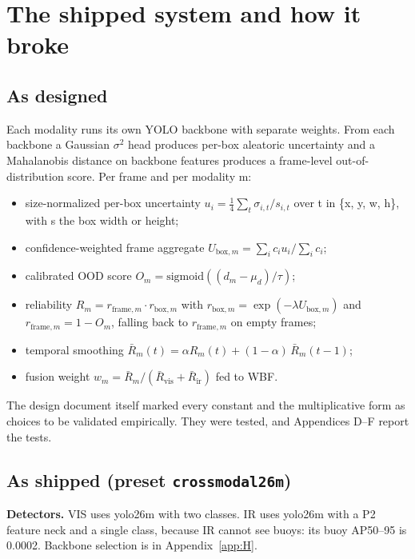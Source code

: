 \documentclass[10pt]{article}
\begin{document}
\FloatBarrier
\section{The shipped system and how it broke}\label{app:D}
\subsection{As designed}\label{app:D.1}
Each modality runs its own YOLO backbone with separate weights. From each backbone a Gaussian $\sigma$$^{2}$ head produces per-box aleatoric uncertainty and a Mahalanobis distance on backbone features produces a frame-level out-of-distribution score. Per frame and per modality m:

\begin{itemize}
\item size-normalized per-box uncertainty $u_i = \frac{1}{4}\sum_t \sigma_{i,t}/s_{i,t}$ over t in \{x, y, w, h\}, with s the box width or height;
\item confidence-weighted frame aggregate $U_{\mathrm{box},m} = \sum_i c_i u_i / \sum_i c_i$;
\item calibrated OOD score $O_m = \mathrm{sigmoid}((d_m - \mu_d)/\tau)$;
\item reliability $R_m = r_{\mathrm{frame},m} \cdot r_{\mathrm{box},m}$ with $r_{\mathrm{box},m} = \exp(-\lambda U_{\mathrm{box},m})$ and $r_{\mathrm{frame},m} = 1 - O_m$, falling back to $r_{\mathrm{frame},m}$ on empty frames;
\item temporal smoothing $\bar{R}_m(t) = \alpha R_m(t) + (1 - \alpha)\,\bar{R}_m(t-1)$;
\item fusion weight $w_m = \bar{R}_m / (\bar{R}_{\mathrm{vis}} + \bar{R}_{\mathrm{ir}})$ fed to WBF.
\end{itemize}

The design document itself marked every constant and the multiplicative form as choices to be validated empirically. They were tested, and Appendices D--F report the tests.

\subsection{As shipped (preset \texttt{crossmodal26m})}\label{app:D.2}
\textbf{Detectors.} VIS uses yolo26m \citep{jocher2026ultralytics} with two classes. IR uses yolo26m with a P2 feature neck and a single class, because IR cannot see buoys: its buoy AP50--95 is 0.0002. Backbone selection is in Appendix~\ref{app:H}.
\end{document}
